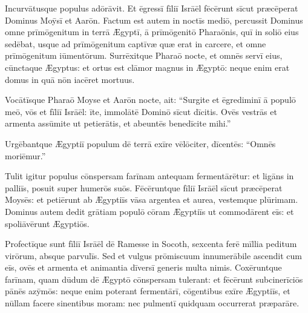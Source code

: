 Incurvātusque populus adōrāvit. Et ēgressī
fīliī Isrāēl fēcērunt sīcut præcēperat Dominus
Moȳsī et Aarōn. Factum est autem in noctīs mediō, percussit Dominus omne
prīmōgenitum in terrā Ægyptī, ā prīmōgenitō
Pharaōnis, quī in soliō eius sedēbat, usque ad prīmōgenitum
captīvæ quæ erat in carcere, et omne prīmōgenitum
iūmentōrum. Surrēxitque Pharaō nocte, et omnēs
servī eius, cūnctaque Ægyptus: et ortus est clāmor magnus in Ægyptō:
neque enim erat domus in quā nōn iacēret mortuus. 

Vocātīsque Pharaō
Moyse et Aarōn nocte, ait: ``Surgite et ēgrediminī ā populō
meō, vōs et fīliī Isrāēl: īte, immolātē Dominō sīcut dīcitis. Ovēs
vestrās et armenta assūmite ut petierātis, et abeuntēs
benedīcite mihi.''

Urgēbantque Ægyptiī
populum dē terrā exīre vēlōciter, dīcentēs: ``Omnēs moriēmur.''

Tulit
igitur populus cōnspersam farīnam antequam
fermentārētur: et ligāns in palliīs, posuit super
humerōs suōs. Fēcēruntque fīliī Isrāēl sīcut præcēperat
Moysēs: et petiērunt ab Ægyptiīs vāsa argentea et aurea, vestemque
plūrimam. Dominus autem dedit grātiam populō cōram Ægyptiīs ut
commodārent eīs: et spoliāvērunt Ægyptiōs. 

Profectīque sunt fīliī Isrāēl dē Ramesse
in Socoth, sexcenta ferē mīllia peditum virōrum, absque parvulīs. Sed et
vulgus prōmiscuum innumerābile ascendit cum eīs, ovēs et armenta et
animantia dīversī generis multa
nimis. Coxēruntque farīnam, quam dūdum dē Ægyptō
cōnspersam tulerant: et fēcērunt subcinerīciōs pānēs
azȳmōs: neque enim poterant fermentārī, cōgentibus exīre
Ægyptiīs, et nūllam facere sinentibus moram: nec pulmentī
quidquam occurrerat præparāre.

